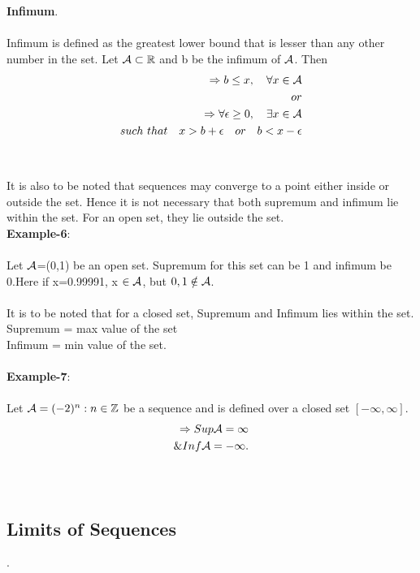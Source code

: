 \documentclass[a4paper]{article}
\begin{document}
\\
\\
\textbf{Infimum}.
\\
\\
Infimum is defined as the greatest lower bound that is lesser than any other number in the set. Let $\mathcal A \subset \mathbb R$ and b be the infimum of $\mathcal A$. Then\\
\begin{align}
\begin{split}
\Rightarrow b \leq x, \quad \forall x \in \mathcal A\\
or\\
\Rightarrow \forall \epsilon \geq 0,\quad \exists x \in \mathcal A 
\\such\  that \quad x > b+\epsilon \quad or \quad b < x-\epsilon
\end{split}
\end{align}
\\
\\
It is also to be noted that sequences may converge to a point either inside or outside the set. Hence it is not necessary that both supremum and infimum lie within the set. For an open set, they lie outside the set.
\\
\textbf{Example-6}:
\\
\\
Let $\mathcal A$=(0,1) be an open set. Supremum for this set can be 1 and infimum be 0.Here if x=0.99991, x $\in \mathcal A$, but $0, 1 \notin \mathcal A$. 
\\
\\
It is to be noted that for a closed set, Supremum and Infimum lies within the set.\\
Supremum = max value of the set \\ Infimum = min value of the set. 
\\
\\
\textbf{Example-7}:
\\
\\
Let $\mathcal A =(-2)^{n}:n\in \mathbb Z$ be a sequence and is defined over a closed set $[-\infty,\infty]$. 
\begin{align}
\begin{split}
\Rightarrow Sup \mathcal A = \infty\\
\& Inf \mathcal A = -\infty.
\end{split}
\end{align} 
\\
\\
\subsection{Limits of Sequences}.
\end{document}
